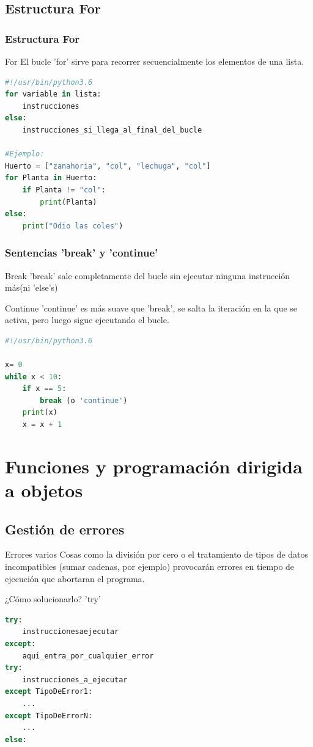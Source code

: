 \documentclass{beamer}
\begin{document}
\subsection{Estructura For}
\begin{frame}[fragile]
\frametitle{Estructura For}
\begin{block}{For}
El bucle 'for' sirve para recorrer secuencialmente los elementos de una lista.
\end{block}
\begin{lstlisting}[language=Python]
#!/usr/bin/python3.6
for variable in lista:
	instrucciones
else:
	instrucciones_si_llega_al_final_del_bucle

#Ejemplo:
Huerto = ["zanahoria", "col", "lechuga", "col"]
for Planta in Huerto:
	if Planta != "col":
		print(Planta)
else:
	print("Odio las coles")

\end{lstlisting}
\end{frame}
\begin{frame}[fragile]
\frametitle{Sentencias 'break' y 'continue'}
\begin{block}{Break}
'break' sale completamente del bucle sin ejecutar ninguna instrucción más(ni 'else's)
\end{block}
\begin{block}{Continue}
'continue' es más suave que 'break', se salta la iteración en la que se activa, pero luego sigue ejecutando el bucle.
\end{block}
\begin{lstlisting}[language=Python]
#!/usr/bin/python3.6

x= 0
while x < 10:
	if x == 5:
		break (o 'continue')
	print(x)
	x = x + 1


\end{lstlisting}
\end{frame}

\section{Funciones y programación dirigida a objetos}
\subsection{Gestión de errores}
\begin{frame}[fragile]
\begin{block}{Errores varios}
Cosas como la división por cero o el tratamiento de tipos de datos incompatibles (sumar cadenas, por ejemplo) provocarán errores en tiempo de ejecución que abortaran el programa.
\end{block} \pause
\begin{exampleblock}{¿Cómo solucionarlo? 'try'}
\end{exampleblock}
\begin{lstlisting}[language=Python]
try:
	instruccionesaejecutar
except:
	aqui_entra_por_cualquier_error
try:
	instrucciones_a_ejecutar
except TipoDeError1:
	...
except TipoDeErrorN:
	...
else:
\end{lstlisting}
\end{frame}
\end{document}

